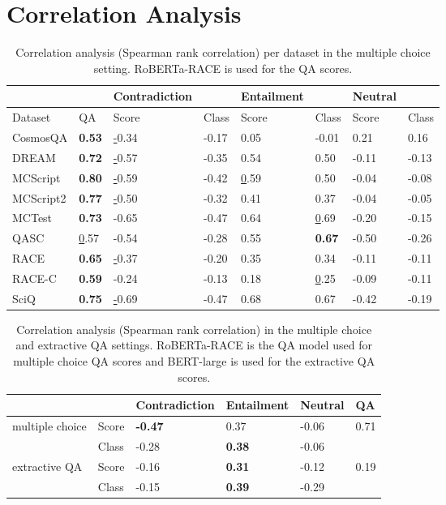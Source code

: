 \documentclass[11pt]{article}
\begin{document}
\section{Correlation Analysis}
\begin{table}[]
\centering
\begin{tabular}{llllllll}
\hline
 &  & Contradiction &  & Entailment &  & Neutral &  \\ \hline
Dataset & QA & Score & Class & Score & Class & Score & Class \\
CosmosQA & \textbf{0.53} & {\ul -0.34} & -0.17 & 0.05 & -0.01 & 0.21 & 0.16 \\
DREAM & \textbf{0.72} & {\ul -0.57} & -0.35 & 0.54 & 0.50 & -0.11 & -0.13 \\
MCScript & \textbf{0.80} & {\ul -0.59} & -0.42 & {\ul 0.59} & 0.50 & -0.04 & -0.08 \\
MCScript2 & \textbf{0.77} & {\ul -0.50} & -0.32 & 0.41 & 0.37 & -0.04 & -0.05 \\
MCTest & \textbf{0.73} & -0.65 & -0.47 & 0.64 & {\ul 0.69} & -0.20 & -0.15 \\
QASC & {\ul 0.57} & -0.54 & -0.28 & 0.55 & \textbf{0.67} & -0.50 & -0.26 \\
RACE & \textbf{0.65} & {\ul -0.37} & -0.20 & 0.35 & 0.34 & -0.11 & -0.11 \\
RACE-C & \textbf{0.59} & -0.24 & -0.13 & 0.18 & {\ul 0.25} & -0.09 & -0.11 \\
SciQ & \textbf{0.75} & {\ul -0.69} & -0.47 & 0.68 & 0.67 & -0.42 & -0.19 \\ \hline
\end{tabular}
\caption{Correlation analysis (Spearman rank correlation) per dataset in the multiple choice setting. RoBERTa-RACE is used for the QA scores.}
\label{tab:per_dataset_correlation}
\end{table}
\begin{table}[]
\centering
\begin{tabular}{llllll}
\hline
 &  & Contradiction & Entailment & Neutral & QA \\ \hline
multiple choice & Score & \textbf{-0.47} & 0.37 & -0.06 & 0.71 \\
 & Class & -0.28 & \textbf{0.38} & -0.06 &  \\
extractive QA & Score & -0.16 & \textbf{0.31} & -0.12 & 0.19 \\
 & Class & -0.15 & \textbf{0.39} & -0.29 &  \\ \hline
\end{tabular}
\caption{Correlation analysis (Spearman rank correlation) in the multiple choice and extractive QA settings. RoBERTa-RACE is the QA model used for multiple choice QA scores and BERT-large is used for the extractive QA scores.}
\label{tab:correlation}
\end{table}
\end{document}
